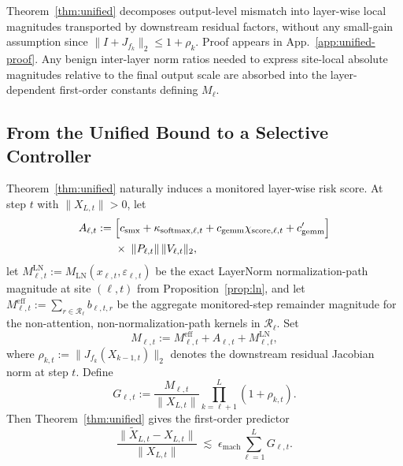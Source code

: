 \documentclass[twoside]{article}
\theoremstyle{definition}
\theoremstyle{remark}
\begin{document}
Theorem~\ref{thm:unified} decomposes output-level mismatch into layer-wise local
magnitudes transported by downstream residual factors, without any small-gain
assumption since $\|I+J_{f_k}\|_2\le 1+\rho_k$. Proof appears in
App.~\ref{app:unified-proof}. Any benign inter-layer norm ratios needed to
express site-local absolute magnitudes relative to the final output scale are
absorbed into the layer-dependent first-order constants defining $M_\ell$.

\subsection{From the Unified Bound to a Selective Controller}
\label{subsec:bgss_theory}

Theorem~\ref{thm:unified} naturally induces a monitored layer-wise risk score.
At step $t$ with $\|X_{L,t}\|>0$, let
\begin{equation}
\label{eq:bgss-attn}
\begin{split}
A_{\ell,t}
:=\;&
\Bigl[
c_{\mathrm{smx}}
+
\kappa_{\mathrm{softmax},\ell,t}
+
c_{\mathrm{gemm}}\chi_{\mathrm{score},\ell,t}
+
c'_{\mathrm{gemm}}
\Bigr]
\\
&\times\;\|P_{\ell,t}\|\,\|V_{\ell,t}\|_2,
\end{split}
\end{equation}
let $M^{\mathrm{LN}}_{\ell,t}:=M_{\mathrm{LN}}(x_{\ell,t},\varepsilon_{\ell,t})$
be the exact LayerNorm normalization-path magnitude at site $(\ell,t)$ from
Proposition~\ref{prop:ln}, and let
$M^{\mathrm{eff}}_{\ell,t}:=\sum_{r\in\mathcal{R}_\ell} b_{\ell,t,r}$ be the
aggregate monitored-step remainder magnitude for the non-attention,
non-normalization-path kernels in $\mathcal{R}_\ell$. Set
\begin{equation}
\label{eq:bgss-local}
M_{\ell,t}
:=
M^{\mathrm{eff}}_{\ell,t}
+
A_{\ell,t}
+
M^{\mathrm{LN}}_{\ell,t},
\end{equation}
where $\rho_{k,t} := \|J_{f_k}(X_{k-1,t})\|_2$ denotes the downstream residual
Jacobian norm at step $t$. Define
\begin{equation}
\label{eq:bgss-layer}
G_{\ell,t}
:=
\frac{M_{\ell,t}}{\|X_{L,t}\|}
\prod_{k=\ell+1}^{L}(1+\rho_{k,t}).
\end{equation}
Then Theorem~\ref{thm:unified} gives the first-order predictor
\begin{equation}
\label{eq:bgss-predictor}
\frac{\|\widetilde{X}_{L,t}-X_{L,t}\|}{\|X_{L,t}\|}
\;\lesssim\;
\epsilon_{\mathrm{mach}}
\sum_{\ell=1}^{L} G_{\ell,t}.
\end{equation}
\end{document}
